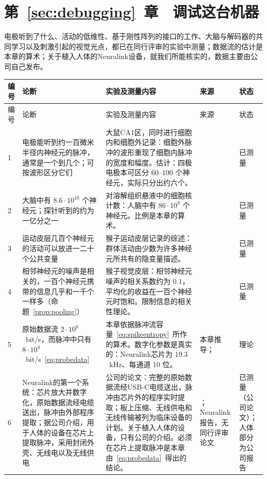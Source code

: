 \section{第~\ref{sec:debugging}~章　调试这台机器}

电极听到了什么、活动的低维性、基于刚性阵列的接口的工作、大脑与解码器的共同学习以及刺激引起的视觉光点，都已在同行评审的实验中测量；数据流的估计是本章的算术；关于植入人体的Neuralink设备，就我们所能核实的，数据主要由公司自己发布。

{\footnotesize
\setlength{\tabcolsep}{3pt}\renewcommand{\arraystretch}{1.15}
\begin{longtable}{>{\raggedright}p{0.5cm}>{\raggedright}p{4.0cm}>{\raggedright}p{5.6cm}>{\raggedright}p{2.3cm}>{\raggedright\arraybackslash}p{1.7cm}}
\toprule
编号 & 论断 & 实验及测量内容 & 来源 & 状态 \\
\midrule\endfirsthead
\toprule
编号 & 论断 & 实验及测量内容 & 来源 & 状态 \\
\midrule\endhead
1 & 电极能听到约一百微米半径内神经元的脉冲，通常是一个到几个；可按波形区分它们 & 大鼠CA1区，同时进行细胞内和细胞外记录：细胞外脉冲的波形重现了细胞内脉冲的宽度和幅度。估计：四极电极本可区分 $60$--$100$ 个神经元，实际只分出约六个。 & \cite{Henze2000extra} & 已测量 \\
2 & 大脑中有 $8.6\cdot10^{10}$ 个神经元；探针听到的约为一亿分之一 & 对溶解组织悬液中的细胞核计数：人脑中有 $86\cdot10^9$ 个神经元。比例是本章的算术。 & \cite{Azevedo2009} & 已测量 \\
3 & 运动皮层几百个神经元的活动可以放进一二十个公共变量 & 猴子运动皮层记录的综述：群体活动由少数为许多神经元所共有的隐变量描述。 & \cite{Gallego2017} & 已测量 \\
4 & 相邻神经元的噪声是相关的，一百个神经元携带的信息几乎和一千个一样多（命题~\ref{prop:pooling}） & 猴子视觉皮层：相邻神经元噪声的相关系数约为 $0.1$，平均化的收益在一百个神经元时饱和。限制信息的相关性理论。 & \cite{Zohary1994, MorenoBote2014} & 已测量 \\
5 & 原始数据流 $2\cdot10^8$~bit/s，而脉冲中只有 $8\cdot10^4$~bit/s~\eqref{eq:probedata} & 本章依据脉冲流容量~\eqref{eq:spikeentropy}~所作的算术。数字化参数是真实的：Neuralink芯片为 $19.3$~kHz、每通道 $10$ 位。 & 本章推导；\cite{Rieke1997, Musk2019} & 理论 \\
6 & Neuralink的第一个系统：芯片放大并数字化，原始数据流经电缆送出，脉冲由外部程序提取；据公司介绍，用于人体的设备在芯片上提取脉冲，采用封闭外壳、无线电以及无线供电 & 公司的论文：完整的原始数据流经USB-C电缆送出，脉冲由芯片外的程序实时提取；板上压缩、无线供电和无线传输被列为临床设备的计划。关于植入人体的设备，只有公司的介绍。必须在芯片上提取脉冲是本章由~\eqref{eq:probedata}~得出的结论。 & \cite{Musk2019}；Neuralink报告，无同行评审论文 & 已测量（公司论文）；人体部分为公司报告 \\

\end{longtable}}
